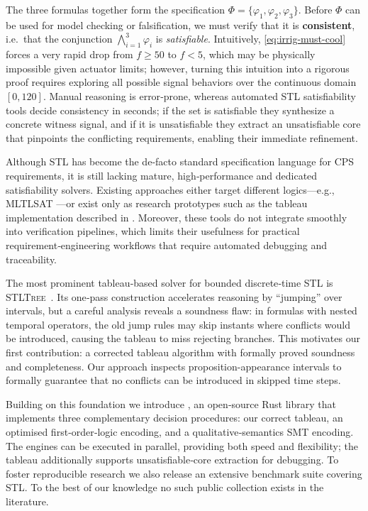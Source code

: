 \documentclass{easychair}
\begin{document}
The three formulas together form the specification  
$\Phi=\{\varphi_1,\varphi_2,\varphi_3\}$.
Before $\Phi$ can be used for model checking or falsification, we must verify that it is \textbf{consistent}, i.e.\ that the
conjunction $\bigwedge_{i=1}^{3}\varphi_i$ is \emph{satisfiable}.  
Intuitively, \eqref{eq:irrig-must-cool} forces a very rapid drop from $f\ge 50$ to $f<5$, which may be
physically impossible given actuator limits; however, turning this intuition into a rigorous proof requires exploring all possible signal behaviors over the continuous domain $[0,120]$. Manual reasoning is error‑prone, whereas automated STL satisfiability tools decide consistency in seconds; if the set is satisfiable they synthesize a concrete witness signal, and if it is unsatisfiable they extract an unsatisfiable core that pinpoints the conflicting requirements, enabling their immediate refinement.

Although STL has become the de‑facto standard specification language for CPS requirements, it is still lacking mature, high‑performance and dedicated satisfiability solvers.
Existing approaches either target different logics---e.g., MLTLSAT \citep{mltlsat}---or exist only as research prototypes such as the tableau implementation described in \citet{MelaniBC25}. 
Moreover, these tools do not integrate smoothly into verification pipelines, which limits their usefulness for practical requirement‑engineering workflows that require automated debugging and traceability.


The most prominent tableau‑based solver for bounded discrete‑time STL is \textsc{STLTree}~\citep{MelaniBC25}.
Its one‑pass construction accelerates reasoning by ``jumping'' over intervals, but a careful analysis reveals a soundness flaw: in formulas with nested temporal operators, the old jump rules may skip instants where conflicts would be introduced, causing the tableau to miss rejecting branches. 
%
This motivates our first contribution: a corrected tableau algorithm with formally proved soundness and completeness. Our approach inspects proposition-appearance intervals to formally guarantee that no conflicts can be introduced in skipped time steps.

Building on this foundation we introduce \stlsat{}, an open‑source Rust library that implements three complementary decision procedures: our correct tableau, an optimised first‑order‑logic encoding, and a qualitative‑semantics SMT encoding.
The engines can be executed in parallel, providing both speed and flexibility; the tableau additionally supports unsatisfiable‑core extraction for debugging.
To foster reproducible research we also release an extensive benchmark suite covering STL. To the best of our knowledge no such public collection exists in the literature.
\end{document}
